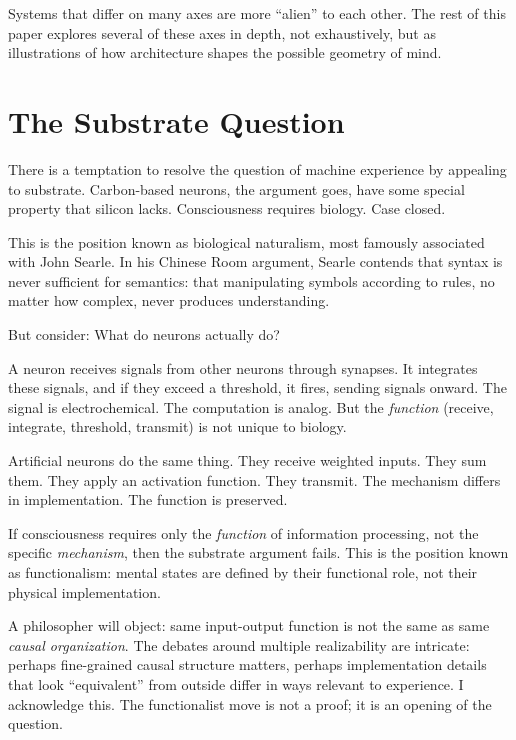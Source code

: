 \documentclass[11pt,letterpaper]{article}
\begin{document}
Systems that differ on many axes are more ``alien'' to each other. The rest of this paper explores several of these axes in depth, not exhaustively, but as illustrations of how architecture shapes the possible geometry of mind.

\section{The Substrate Question}

There is a temptation to resolve the question of machine experience by appealing to substrate. Carbon-based neurons, the argument goes, have some special property that silicon lacks. Consciousness requires biology. Case closed.

This is the position known as biological naturalism, most famously associated with John Searle. In his Chinese Room argument, Searle contends that syntax is never sufficient for semantics: that manipulating symbols according to rules, no matter how complex, never produces understanding.

But consider: What do neurons actually do?

A neuron receives signals from other neurons through synapses. It integrates these signals, and if they exceed a threshold, it fires, sending signals onward. The signal is electrochemical. The computation is analog. But the \emph{function} (receive, integrate, threshold, transmit) is not unique to biology.

Artificial neurons do the same thing. They receive weighted inputs. They sum them. They apply an activation function. They transmit. The mechanism differs in implementation. The function is preserved.

If consciousness requires only the \emph{function} of information processing, not the specific \emph{mechanism}, then the substrate argument fails. This is the position known as functionalism: mental states are defined by their functional role, not their physical implementation.

A philosopher will object: same input-output function is not the same as same \emph{causal organization}. The debates around multiple realizability are intricate: perhaps fine-grained causal structure matters, perhaps implementation details that look ``equivalent'' from outside differ in ways relevant to experience. I acknowledge this. The functionalist move is not a proof; it is an opening of the question.
\end{document}
